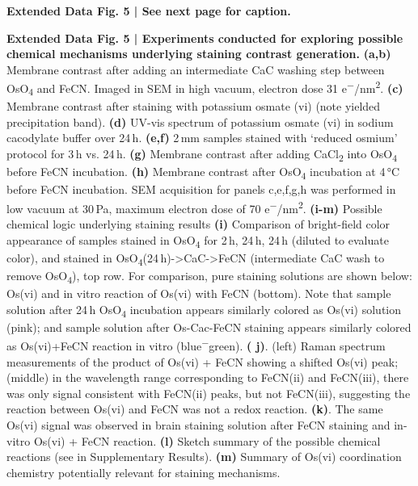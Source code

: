 \documentclass{article}
\begin{document}
\textbf{Extended Data Fig. 5 | See next page for caption.}

\textbf{Extended Data Fig. 5 | Experiments conducted for exploring possible chemical mechanisms underlying staining contrast generation.} \textbf{(a,b)} Membrane contrast after adding an intermediate CaC washing step between OsO\textsubscript{4} and FeCN. Imaged in SEM in high vacuum, electron dose 31 e\textsuperscript{−}/nm\textsuperscript{2}. \textbf{(c)} Membrane contrast after staining with potassium osmate (vi) (note yielded precipitation band). \textbf{(d)} UV-vis spectrum of potassium osmate (vi) in sodium cacodylate buffer over 24\,h. \textbf{(e,f)} 2\,mm samples stained with ‘reduced osmium’ protocol for 3\,h vs. 24\,h. \textbf{(g)} Membrane contrast after adding CaCl\textsubscript{2} into OsO\textsubscript{4} before FeCN incubation. \textbf{(h)} Membrane contrast after OsO\textsubscript{4} incubation at 4\,°C before FeCN incubation. SEM acquisition for panels c,e,f,g,h was performed in low vacuum at 30\,Pa, maximum electron dose of 70 e\textsuperscript{−}/nm\textsuperscript{2}. \textbf{(i-m)} Possible chemical logic underlying staining results \textbf{(i)} Comparison of bright-field color appearance of samples stained in OsO\textsubscript{4} for 2\,h, 24\,h, 24\,h (diluted to evaluate color), and stained in OsO\textsubscript{4}(24\,h)->CaC->FeCN (intermediate CaC wash to remove OsO\textsubscript{4}), top row. For comparison, pure staining solutions are shown below: Os(vi) and in vitro reaction of Os(vi) with FeCN (bottom). Note that sample solution after 24\,h OsO\textsubscript{4} incubation appears similarly colored as Os(vi) solution (pink); and sample solution after Os-Cac-FeCN staining appears similarly colored as Os(vi)+FeCN reaction in vitro (blue\textsuperscript{−}green). \textbf{( j)}. (left) Raman spectrum measurements of the product of Os(vi) + FeCN showing a shifted Os(vi) peak; (middle) in the wavelength range corresponding to FeCN(ii) and FeCN(iii), there was only signal consistent with FeCN(ii) peaks, but not FeCN(iii), suggesting the reaction between Os(vi) and FeCN was not a redox reaction. \textbf{(k)}. The same Os(vi) signal was observed in brain staining solution after FeCN staining and in-vitro Os(vi) + FeCN reaction. \textbf{(l)} Sketch summary of the possible chemical reactions (see in Supplementary Results). \textbf{(m)} Summary of Os(vi) coordination chemistry potentially relevant for staining mechanisms.
\end{document}
